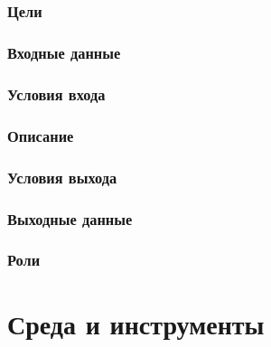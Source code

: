 \documentclass{tpks}
\begin{document}
\subsection{}
\subsubsection{Цели}
\clarify{}
\subsubsection{Входные данные}
\clarify{}
\subsubsection{Условия входа}
\clarify{}
\subsubsection{Описание}
\clarify{}
\subsubsection{Условия выхода}
\clarify{}
\subsubsection{Выходные данные}
\clarify{}
\subsubsection{Роли}
\clarify{}

\section{Среда и инструменты}
\end{document}
